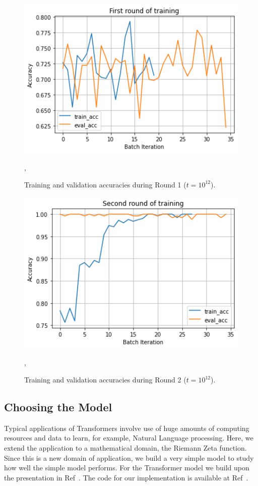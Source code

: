 \documentclass[twoside]{article}
\begin{document}
\begin{figure}
\includegraphics[width=1.0\textwidth]{Round1.png}
\caption[]{ 
 Training and validation accuracies during Round 1 ($t=10^{12}$).
 }
\vspace{1mm}, 
\label{fig:round1}
\end{figure}


\begin{figure}
\includegraphics[width=1.0\textwidth]{Round2.png}
\caption[]{ 
 Training and validation accuracies during Round 2 ($t=10^{12}$).
 }
\vspace{1mm}, 
\label{fig:round2}
\end{figure}




\subsection{\label{sec3.1} Choosing the Model}
Typical applications of Transformers involve use of huge amounts of computing resources and data to learn, for example, Natural Language processing. Here, we extend the application to a mathematical domain, the Riemann Zeta function. Since this is a new domain of application, we build a very simple model to study how well the simple model performs. For the Transformer model we build upon the presentation in  Ref~\cite{BenjaminEtienne}. The code for our implementation is available at 
 Ref~\cite{shankergit}.
\end{document}
